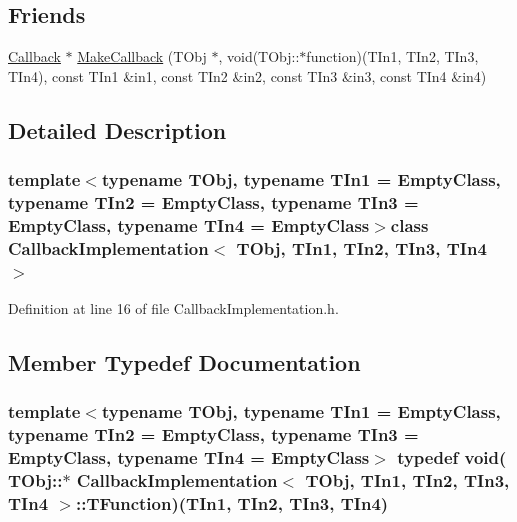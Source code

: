 \subsection*{Friends}
\begin{DoxyCompactItemize}
\item 
\hyperlink{class_callback}{Callback} $\ast$ \hyperlink{class_callback_implementation_aea6fc67789f722130dd7af29e0035752}{Make\-Callback} (T\-Obj $\ast$, void(T\-Obj\-::$\ast$function)(T\-In1, T\-In2, T\-In3, T\-In4), const T\-In1 \&in1, const T\-In2 \&in2, const T\-In3 \&in3, const T\-In4 \&in4)
\end{DoxyCompactItemize}


\subsection{Detailed Description}
\subsubsection*{template$<$typename T\-Obj, typename T\-In1 = Empty\-Class, typename T\-In2 = Empty\-Class, typename T\-In3 = Empty\-Class, typename T\-In4 = Empty\-Class$>$class Callback\-Implementation$<$ T\-Obj, T\-In1, T\-In2, T\-In3, T\-In4 $>$}



Definition at line 16 of file Callback\-Implementation.\-h.



\subsection{Member Typedef Documentation}
\hypertarget{class_callback_implementation_ad435dd89094bf90ed2f1cf7b19f055c9}{
\subsubsection[{T\-Function}]{\setlength{\rightskip}{0pt plus 5cm}template$<$typename T\-Obj, typename T\-In1 = Empty\-Class, typename T\-In2 = Empty\-Class, typename T\-In3 = Empty\-Class, typename T\-In4 = Empty\-Class$>$ typedef void( T\-Obj\-::$\ast$ {\bf Callback\-Implementation}$<$ T\-Obj, T\-In1, T\-In2, T\-In3, T\-In4 $>$\-::T\-Function)(T\-In1, T\-In2, T\-In3, T\-In4)}}\label{class_callback_implementation_ad435dd89094bf90ed2f1cf7b19f055c9}


